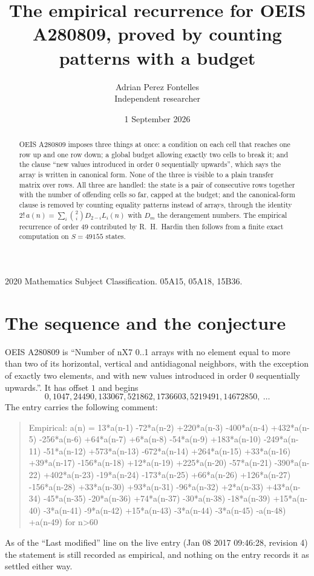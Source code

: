 \documentclass[11pt,a4paper]{article}
\title{The empirical recurrence for OEIS A280809, proved by counting patterns with a budget}
\author{Adrian Perez Fontelles\\ \small Independent researcher}
\date{1 September 2026}
\theoremstyle{plain}
\theoremstyle{definition}
\begin{document}
\maketitle

\begin{abstract}
OEIS A280809 imposes three things at once: a condition on each cell that reaches one row up and
one row down; a global budget allowing exactly two cells to
break it; and the clause ``new values introduced in order $0$ sequentially upwards'', which
says the array is written in canonical form. None of the three is visible to a plain transfer
matrix over rows. All three are handled: the state is a pair of consecutive rows
together with the number of offending cells so far, capped at the budget; and the
canonical-form clause is removed by counting equality patterns instead of arrays, through the
identity $2!\,a(n)=\sum_i\binom{2}{i}D_{2-i}L_i(n)$ with $D_m$ the derangement
numbers. The empirical recurrence of order $49$ contributed by R.~H.~Hardin then follows
from a finite exact computation on $S=49155$ states.
\end{abstract}

\noindent\small 2020 Mathematics Subject Classification. 05A15, 05A18, 15B36.\normalsize

\section{The sequence and the conjecture}

OEIS A280809 is ``Number of nX7 0..1 arrays with no element equal to more than two of its horizontal, vertical and antidiagonal neighbors, with the exception of exactly two elements, and with new values introduced in order 0 sequentially upwards.''. It has offset $1$ and begins
\[
0, 1047, 24490, 133067, 521862, 1736603, 5219491, 14672850,\ \dots
\]
The entry carries the following comment:
\begin{quote}\small
Empirical: a(n) = 13*a(n-1) -72*a(n-2) +220*a(n-3) -400*a(n-4) +432*a(n-5) -256*a(n-6) +64*a(n-7) +6*a(n-8) -54*a(n-9) +183*a(n-10) -249*a(n-11) -51*a(n-12) +573*a(n-13) -672*a(n-14) +264*a(n-15) +33*a(n-16) +39*a(n-17) -156*a(n-18) +12*a(n-19) +225*a(n-20) -57*a(n-21) -390*a(n-22) +402*a(n-23) -19*a(n-24) -173*a(n-25) +66*a(n-26) +126*a(n-27) -156*a(n-28) +33*a(n-30) +93*a(n-31) -96*a(n-32) +2*a(n-33) +43*a(n-34) -45*a(n-35) -20*a(n-36) +74*a(n-37) -30*a(n-38) -18*a(n-39) +15*a(n-40) -3*a(n-41) -9*a(n-42) +15*a(n-43) -3*a(n-44) -3*a(n-45) -a(n-48) +a(n-49) for n>60
\end{quote}
As of the ``Last modified'' line on the live entry (Jan 08 2017 09:46:28, revision 4) the statement is
still recorded as empirical, and nothing on the entry records it as settled either way.
\end{document}
